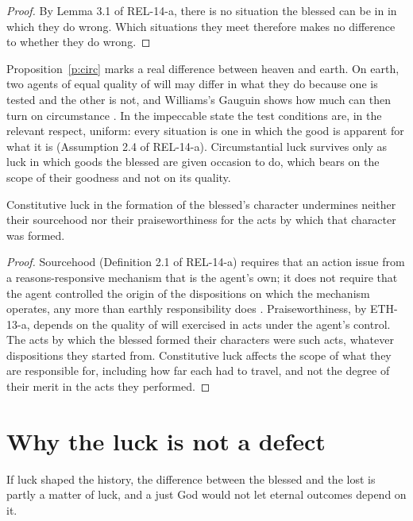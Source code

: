 \documentclass{situationist-preprint}
\begin{document}
\begin{proof}
By Lemma 3.1 of REL-14-a, there is no situation the blessed can be in in which they do wrong. Which situations they meet therefore makes no difference to whether they do wrong.
\end{proof}

Proposition~\ref{p:circ} marks a real difference between heaven and earth. On earth, two agents of equal quality of will may differ in what they do because one is tested and the other is not, and Williams's Gauguin shows how much can then turn on circumstance \citep{Williams1981}. In the impeccable state the test conditions are, in the relevant respect, uniform: every situation is one in which the good is apparent for what it is (Assumption 2.4 of REL-14-a). Circumstantial luck survives only as luck in which goods the blessed are given occasion to do, which bears on the scope of their goodness and not on its quality.

\begin{proposition}\label{p:const}
Constitutive luck in the formation of the blessed's character undermines neither their sourcehood nor their praiseworthiness for the acts by which that character was formed.
\end{proposition}

\begin{proof}
Sourcehood (Definition 2.1 of REL-14-a) requires that an action issue from a reasons-responsive mechanism that is the agent's own; it does not require that the agent controlled the origin of the dispositions on which the mechanism operates, any more than earthly responsibility does \citep[ch.~8]{FischerRavizza1998}. Praiseworthiness, by ETH-13-a, depends on the quality of will exercised in acts under the agent's control. The acts by which the blessed formed their characters were such acts, whatever dispositions they started from. Constitutive luck affects the scope of what they are responsible for, including how far each had to travel, and not the degree of their merit in the acts they performed.
\end{proof}

\section{Why the luck is not a defect}

\begin{objection}
If luck shaped the history, the difference between the blessed and the lost is partly a matter of luck, and a just God would not let eternal outcomes depend on it.
\end{objection}
\end{document}
